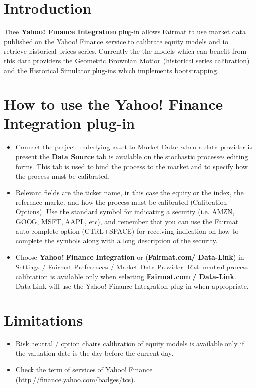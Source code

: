 \newcommand{\pluginName}{Yahoo! Finance Integration}
\newcommand{\pluginVersion}{1.0}





\PluginTitle{\pluginName}{\pluginVersion}

\section{Introduction}
Thee \textbf{\pluginName}  plug-in allows Fairmat to use market data published on the Yahoo! Finance service to calibrate equity models and to retrieve historical prices series. 
Currently the the models which can benefit from this data providers the Geometric Brownian Motion (historical series calibration) and the Historical Simulator plug-ins which implements bootstrapping.



\section{How to use the \pluginName { } plug-in}
\begin{itemize}
\item Connect the project underlying asset to Market Data: when a data provider is present the \textbf{Data Source} tab is available on the stochastic processes editing forms. 
This tab is used to bind the process to the market and to specify how the process must be calibrated. 
\item Relevant fields are the ticker name, in this case the equity or the index, the reference market
and how the process must be calibrated (Calibration Options). Use the standard symbol for indicating a security  (i.e. AMZN, GOOG, MSFT, AAPL, etc), and remember that you can use the Fairmat auto-complete option (CTRL+SPACE) for receiving indication on how to complete the symbols along with a long description of the security.
\item Choose \textbf{\pluginName} or (\textbf{Fairmat.com/ Data-Link})  in Settings / Fairmat Preferences / Market Data Provider.  
Risk neutral process calibration  is available only when selecting \textbf{Fairmat.com / Data-Link}. Data-Link will use  the \pluginName {} plug-in when appropriate. 
\end{itemize}

\section{Limitations}
\begin{itemize}
\item Risk neutral / option chains calibration of equity models is available only if the valuation date is the day before the current day. 
\item Check the term of services of Yahoo! Finance (\url{http://finance.yahoo.com/badges/tos}).
\end{itemize}

